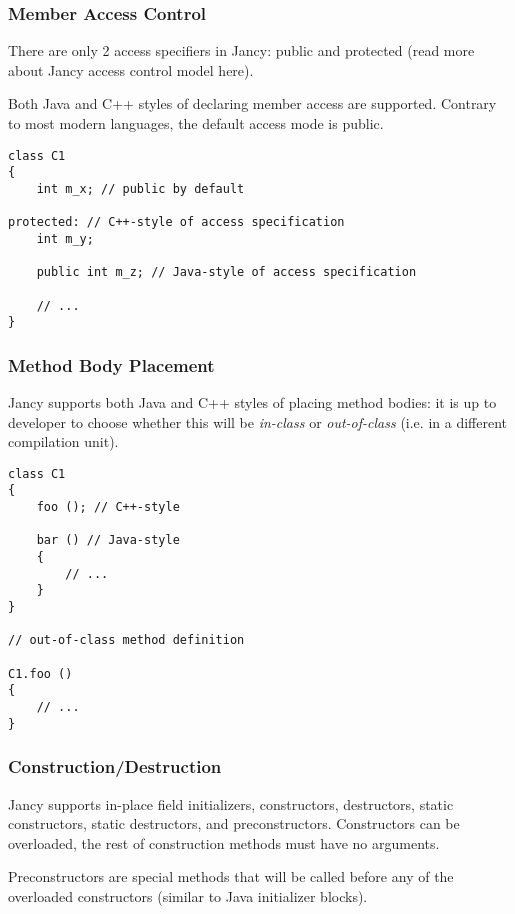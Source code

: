 \documentclass[oneside]{book}
\begin{document}
\subsubsection{Member Access Control}

There are only 2 access specifiers in Jancy: public and protected (read more about Jancy access control model here).

Both Java and C++ styles of declaring member access are supported. Contrary to most modern languages, the default access mode is public.

\begin{lstlisting}
class C1
{
    int m_x; // public by default

protected: // C++-style of access specification
    int m_y;

    public int m_z; // Java-style of access specification

    // ...
}
\end{lstlisting}

\subsubsection{Method Body Placement}

Jancy supports both Java and C++ styles of placing method bodies: it is up to developer to choose whether this will be \emph{in-class} or \emph{out-of-class} (i.e. in a different compilation unit).

\begin{lstlisting}
class C1 
{
    foo (); // C++-style

    bar () // Java-style
    {
        // ...
    }
}

// out-of-class method definition

C1.foo ()
{
    // ...
}
\end{lstlisting}

\subsubsection{Construction/Destruction}

Jancy supports in-place field initializers, constructors, destructors, static constructors, static destructors, and preconstructors. Constructors can be overloaded, the rest of construction methods must have no arguments.

Preconstructors are special methods that will be called before any of the overloaded constructors (similar to Java initializer blocks).
\end{document}
